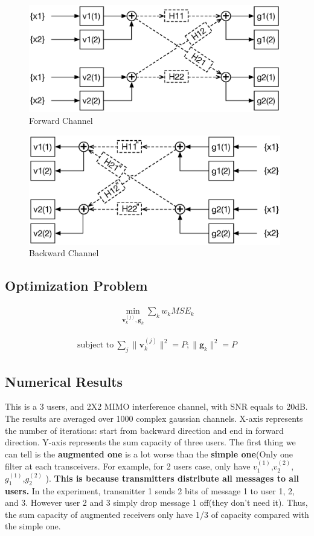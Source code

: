 \documentclass[11pt, oneside]{article}   	%
\begin{document}
 \begin{figure}[h]
    \centering
    \centerline{\includegraphics[width=110mm]{forward_channel_3}}
    \caption{Forward Channel}
\end{figure} 

\begin{figure}[h]
    \centering
    \centerline{\includegraphics[width=110mm]{backward_channel_3}}
    \caption{Backward Channel}
\end{figure} 

\subsection{Optimization Problem}
\begin{align*}
\min_{\textbf{v}_{k}^{(j)} ,\textbf{g}_{k}} \displaystyle\sum_{k} 	w_k	MSE_{k}	
\end{align*}

\begin{align*}
\text{subject to}  \ \displaystyle\sum_{j}	\|	\textbf{v}^{(j)}_{k}	\|^{2} = P; \| \textbf{g}_{k}	\|^{2} = P
\end{align*}


\subsection{Numerical Results}
This is a 3 users, and 2X2 MIMO interference channel, with SNR equals to 20dB. The results are averaged over 1000 complex gaussian channels. X-axis represents the number of iterations: start from backward direction and end in forward direction. Y-axis represents the sum capacity of three users. The first thing we can tell is the \textbf{augmented one} is a lot worse than the \textbf{simple one}(Only one filter at each transceivers. For example, for 2 users case, only have $v^{(1)}_1$,$v^{(2)}_2$,$g^{(1)}_1$,$g^{(2)}_2$ ). \textbf{This is because transmitters distribute all messages to all users.} In the experiment, transmitter 1 sends 2 bits of message 1 to user 1, 2, and 3. However user 2 and 3 simply drop message 1 off(they don't need it). Thus, the sum capacity of augmented receivers only have 1/3 of capacity compared with the simple one.
\end{document}
